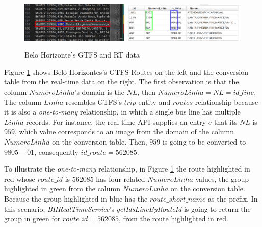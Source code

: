 \begin{figure}[h]
     \centering
        \caption{Belo Horizonte's GTFS and RT data }
        \includegraphics[width=\textwidth]{imagem/cap5/gtfsxapi.png}
        \label{img:5:1}
\end{figure}

Figure \ref{img:5:1} shows Belo Horizontes's GTFS Routes on the left 
and the conversion table from the real-time data on the right. The first 
observation is that the column $NumeroLinha$'s domain is the $NL$, then 
$NumeroLinha = NL = id\_line$. The column $Linha$ resembles GTFS's $trip$ entity
and $routes$ relationship because it is also a \textit{one-to-many} relationship, 
in which a single bus line has multiple $Linha$ records.
For instance, the real-time API supplies an entry $e$ 
that its $NL$ is $959$, which value corresponds to an image from the domain of the 
column $NumeroLinha$ on the conversion table. Then, $959$ is going to be converted to 
$9805-01$, consequently $id\_route = 562085$.


To illustrate the \textit{one-to-many} relationship, in Figure \ref{img:5:1}
the route highlighted in red whose $route\_id$ is $562085$ has four related $NumeroLinha$ values, the group highlighted in green from the 
column $NumeroLinha$ on the conversion table. Because the group highlighted in blue
has the $route\_short\_name$ as the prefix. 
In this scenario, \textit{BHRealTimeService}'s \textit{getIdsLineByRouteId} is going
to return the group in green for $route\_id = 562085$, from the route highlighted in red.
